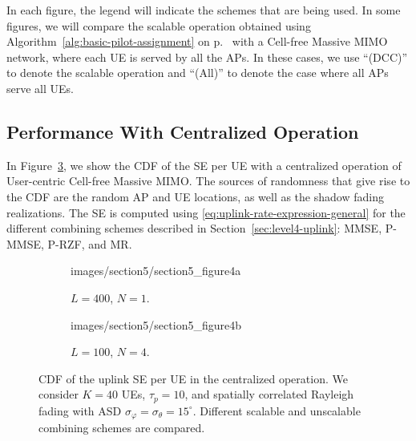 In each figure, the legend will indicate the schemes that are being used.
In some figures, we will compare the scalable operation obtained using Algorithm~\ref{alg:basic-pilot-assignment} on p.~\pageref{alg:basic-pilot-assignment} with a Cell-free Massive MIMO network, where each UE is served by all the APs. In these cases, we use ``(DCC)'' to denote the scalable operation and ``(All)'' to denote the case where all APs serve all UEs.

\subsection{Performance With Centralized Operation}\label{centralized-operation-uplink}

In Figure~\ref{figureSec5_1}, we show the \gls{CDF} of the SE per UE with a centralized operation of User-centric Cell-free Massive MIMO. The sources of randomness that give rise to the CDF are the random AP and UE locations, as well as the shadow fading realizations. The SE is computed using \eqref{eq:uplink-rate-expression-general} for the different combining schemes described in Section~\ref{sec:level4-uplink}: MMSE, P-MMSE, P-RZF, and MR. 


\begin{figure}[p!]
        \begin{subfigure}[b]{\columnwidth} \centering 
	\begin{overpic}[width=0.88\columnwidth,tics=10]{images/section5/section5_figure4a}
\end{overpic} \label{figureSec5_1a} 
                \caption{$L=400$, $N=1$.} 
                \vspace{4mm}
        \end{subfigure} 
        \begin{subfigure}[b]{\columnwidth} \centering 
	\begin{overpic}[width=0.88\columnwidth,tics=10]{images/section5/section5_figure4b}
\end{overpic} \label{figureSec5_1b} 
                \caption{$L=100$, $N=4$.} 
        \end{subfigure} 
	\caption{ CDF of the uplink SE per UE in the centralized operation. We consider $K=40$ UEs, $\tau_p=10$, and spatially correlated Rayleigh  fading with ASD $\sigma_{\varphi}=\sigma_{\theta}=15^{\circ}$. Different scalable and unscalable combining schemes are compared.}\label{figureSec5_1}
\end{figure}

